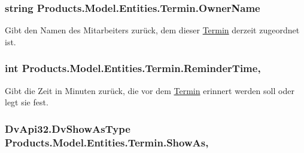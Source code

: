 \subsubsection[{\texorpdfstring{Owner\+Name}{OwnerName}}]{\setlength{\rightskip}{0pt plus 5cm}string Products.\+Model.\+Entities.\+Termin.\+Owner\+Name\hspace{0.3cm}{\ttfamily [get]}}\hypertarget{class_products_1_1_model_1_1_entities_1_1_termin_a0fbacd8bfbc1986a201c9c0e57529e50}{}\label{class_products_1_1_model_1_1_entities_1_1_termin_a0fbacd8bfbc1986a201c9c0e57529e50}


Gibt den Namen des Mitarbeiters zurück, dem dieser \hyperlink{class_products_1_1_model_1_1_entities_1_1_termin}{Termin} derzeit zugeordnet ist. 

\subsubsection[{\texorpdfstring{Reminder\+Time}{ReminderTime}}]{\setlength{\rightskip}{0pt plus 5cm}int Products.\+Model.\+Entities.\+Termin.\+Reminder\+Time\hspace{0.3cm}{\ttfamily [get]}, {\ttfamily [set]}}\hypertarget{class_products_1_1_model_1_1_entities_1_1_termin_adbc2d192f3a06c8d91851aed87ff1a2b}{}\label{class_products_1_1_model_1_1_entities_1_1_termin_adbc2d192f3a06c8d91851aed87ff1a2b}


Gibt die Zeit in Minuten zurück, die vor dem \hyperlink{class_products_1_1_model_1_1_entities_1_1_termin}{Termin} erinnert werden soll oder legt sie fest. 

\subsubsection[{\texorpdfstring{Show\+As}{ShowAs}}]{\setlength{\rightskip}{0pt plus 5cm}Dv\+Api32.\+Dv\+Show\+As\+Type Products.\+Model.\+Entities.\+Termin.\+Show\+As\hspace{0.3cm}{\ttfamily [get]}, {\ttfamily [set]}}\hypertarget{class_products_1_1_model_1_1_entities_1_1_termin_a707233dc8fee37b697ede7bd39879fc4}{}\label{class_products_1_1_model_1_1_entities_1_1_termin_a707233dc8fee37b697ede7bd39879fc4}


